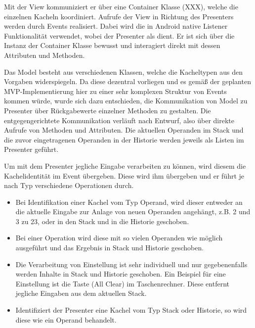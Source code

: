 Mit der View kommuniziert er über eine Container Klasse (XXX), welche die einzelnen Kacheln koordiniert. Aufrufe der View in Richtung des Presenters werden durch Events realisiert. Dabei wird die in Android native Listener Funktionalität verwendet, wobei der Presenter als  dient. Er ist sich über die Instanz der Container Klasse bewusst und interagiert direkt mit dessen Attributen und Methoden.

Das Model besteht aus verschiedenen Klassen, welche die Kacheltypen aus den Vorgaben widerspiegeln. Da diese dezentral vorliegen und es gemäß der geplanten MVP-Implementierung hier zu einer sehr komplexen Struktur von Events kommen würde, wurde sich dazu entschieden, die Kommunikation von Model zu Presenter über Rückgabewerte einzelner Methoden zu gestalten. Die entgegengerichtete Kommunikation verläuft nach Entwurf, also über direkte Aufrufe von Methoden und Attributen. Die aktuellen Operanden im Stack und die zuvor eingetragenen Operanden in der Historie werden jeweils als Listen im Presenter geführt.

Um mit dem Presenter jegliche Eingabe verarbeiten zu können, wird diesem die Kachelidentität im Event übergeben. Diese wird ihm übergeben und er führt je nach Typ verschiedene Operationen durch.

\begin{itemize}
\item Bei Identifikation einer Kachel vom Typ Operand, wird dieser entweder an die aktuelle Eingabe zur Anlage von neuen Operanden angehängt, z.B. 2 und 3 zu 23, oder in den Stack und in die Historie geschoben. 
\item Bei einer Operation wird diese mit so vielen Operanden wie möglich ausgeführt und das Ergebnis in Stack und Historie geschoben.
\item Die Verarbeitung von Einstellung ist sehr individuell und nur gegebenenfalls werden Inhalte in Stack und Historie geschoben. Ein Beispiel für eine Einstellung ist die Taste  (All Clear) im Taschenrechner. Diese entfernt jegliche Eingaben aus dem aktuellen Stack.
\item Identifiziert der Presenter eine Kachel vom Typ Stack oder Historie, so wird diese wie ein Operand behandelt.
\end{itemize}


